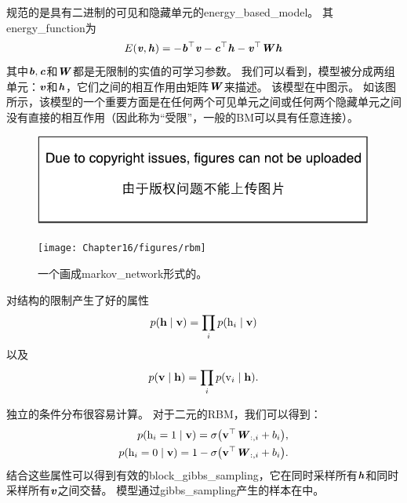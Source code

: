 规范的是具有二进制的可见和隐藏单元的\gls{energy_based_model}。 其\gls{energy_function}为
\begin{align}
\label{eqn:1610}
E(\boldsymbol{\mathit{v}},\boldsymbol{\mathit{h}}) = -\boldsymbol{\mathit{b}}^{\top}\boldsymbol{\mathit{v}} - \boldsymbol{\mathit{c}}^{\top}\boldsymbol{\mathit{h}} - \boldsymbol{\mathit{v}}^{\top}\boldsymbol{\mathit{W}}\boldsymbol{\mathit{h}}
\end{align}
其中$\boldsymbol{\mathit{b}},\boldsymbol{\mathit{c}}$和$\boldsymbol{\mathit{W}}$都是无限制的实值的可学习参数。
我们可以看到，模型被分成两组单元：$\boldsymbol{\mathit{v}}$和$\boldsymbol{\mathit{h}}$，它们之间的相互作用由矩阵$\boldsymbol{\mathit{W}}$来描述。
该模型在中图示。
如该图所示，该模型的一个重要方面是在任何两个可见单元之间或任何两个隐藏单元之间没有直接的相互作用（因此称为``受限''，一般的\gls{BM}可以具有任意连接）。



\begin{figure}[!htb]
\ifOpenSource
\centerline{\includegraphics{figure.pdf}}
\else
	\centerline{\texttt{[image: Chapter16/figures/rbm]}}	
\fi
	\caption{一个画成\gls{markov_network}形式的。}
	\label{fig:rbm}
\end{figure}



对结构的限制产生了好的属性
\begin{align}
\label{eqn:1611}
p(\mathbf{h}\mid\mathbf{v}) = \prod_i p(\mathrm{h}_i\mid \mathbf{v})
\end{align}
以及
\begin{align}
\label{eqn:1612}
p(\mathbf{v}\mid\mathbf{h}) = \prod_i p(\mathrm{v}_i\mid \mathbf{h}).
\end{align}


独立的条件分布很容易计算。
对于二元的\gls{RBM}，我们可以得到：
\begin{align}
\label{eqn:1613}
\begin{aligned}
p(\mathrm{h}_i = 1\mid\mathbf{v}) = \sigma\big(\mathbf{v}^{\top}\boldsymbol{\mathit{W}}_{:,i} + b_i\big),\\
p(\mathrm{h}_i = 0\mid\mathbf{v}) = 1 - \sigma\big(\mathbf{v}^{\top}\boldsymbol{\mathit{W}}_{:,i} + b_i\big).\\
\end{aligned}
\end{align}
结合这些属性可以得到有效的\gls{block_gibbs_sampling}，它在同时采样所有$\boldsymbol{\mathit{h}}$和同时采样所有$\boldsymbol{\mathit{v}}$之间交替。
模型通过\gls{gibbs_sampling}产生的样本在中。

